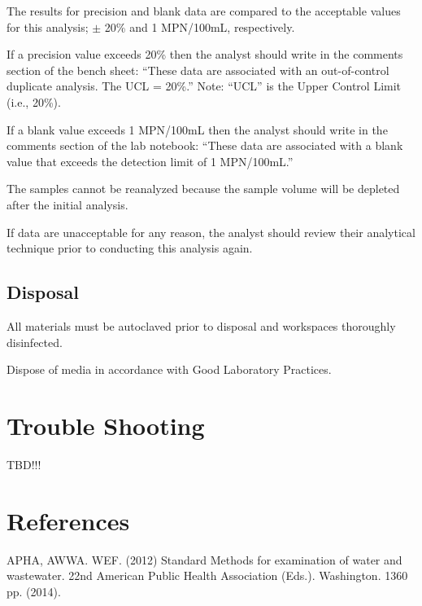 \documentclass[12pt]{../SOP4_alpha}\usepackage[]{graphicx}\usepackage[]{xcolor}
\begin{document}
\NP The results for precision and blank data are compared to the
acceptable values for this analysis; $\pm$ 20\% and 1 MPN/100mL,
respectively.

\NP If a precision value exceeds 20\% then the analyst should write in the
comments section of the bench sheet: “These data are associated
with an out-of-control duplicate analysis. The UCL = 20\%.” Note:
``UCL'' is the Upper Control Limit (i.e., 20\%).

\NP If a blank value exceeds 1 MPN/100mL then the analyst should write
in the comments section of the lab notebook: ``These data are
associated with a blank value that exceeds the detection limit of 1
MPN/100mL.''

\NP The samples cannot be reanalyzed because the sample volume will be
depleted after the initial analysis.

\NP  If data are unacceptable for any reason, the analyst should review
their analytical technique prior to conducting this analysis again. 

\subsection{Disposal}


\NP All materials must be autoclaved prior to disposal and workspaces
thoroughly disinfected.

\NP Dispose of media in accordance with Good Laboratory Practices.

\section{Trouble Shooting}

TBD!!! 


\section{References}

\NP APHA, AWWA. WEF. (2012) Standard Methods for examination of water and wastewater. 22nd American Public Health Association (Eds.). Washington. 1360 pp. (2014).

\appendix



\end{document}
